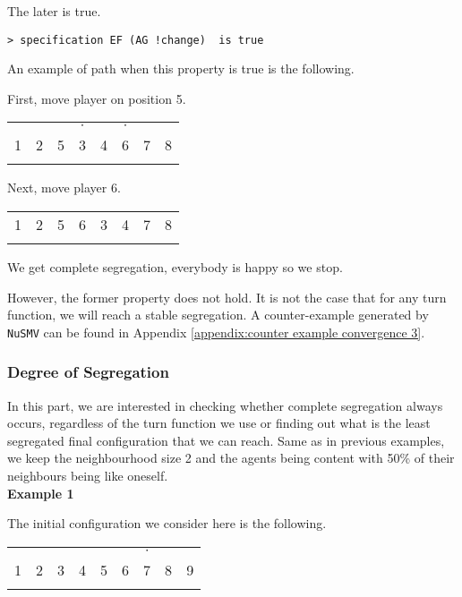 \documentclass[../main.tex]{subfiles}
\begin{document}
The later is true.
 \begin{lstlisting}
> specification EF (AG !change)  is true
 \end{lstlisting}
 
 An example of path when this property is true is the following.
 
 First, move player on position 5.
 \begin{table}[H]
\begin{center}
{\begin{tabular}{| c |c| c| c| c |c| c |c| }
\hline
 &  &   &  $\cdot$ &  & $\cdot$ &   &  \\
1 & 2 &5 &3 &4 &6  &7 &8\\
\x & \x &\x &\z &\z &\x  &\z &\z  \\
 \hline
\end{tabular}}
\end{center}
\end{table}
Next, move player 6.
 \begin{table}[H]
\begin{center}
{\begin{tabular}{| c |c| c| c| c |c| c |c| }
\hline
1 & 2 &5 &6 &3 &4  &7 &8\\
\x & \x &\x &\x &\z &\z  &\z &\z  \\
 \hline
\end{tabular}}
\end{center}
\end{table}
We get complete segregation, everybody is happy so we stop.

However, the former property does not hold. It is not the case that for any turn function, we will reach a stable segregation.
A counter-example generated by \verb|NuSMV| can be found in Appendix \ref{appendix:counter example convergence 3}.

\subsubsection{Degree of Segregation}
In this part, we are interested in checking whether complete segregation always occurs, regardless of the turn function we use or finding out what is the least segregated final configuration that we can reach. Same as in previous examples, we keep the neighbourhood size 2 and the agents being content with 50\% of their neighbours being like oneself. \\

\textbf{Example 1}

The initial configuration we consider here is the following.
 \begin{table}[H]
\begin{center}
{\begin{tabular}{| c |c| c| c| c |c| c |c|c| }
\hline
 &  &   &  & &  & $\cdot$ &   &  \\
1 & 2  &3 &4 &5 &6  &7 &8 & 9\\
\x & \x &\x &\z &\z & \z &\x  &\z &\z  \\
 \hline
\end{tabular}}
\end{center}
\end{table}
\end{document}
